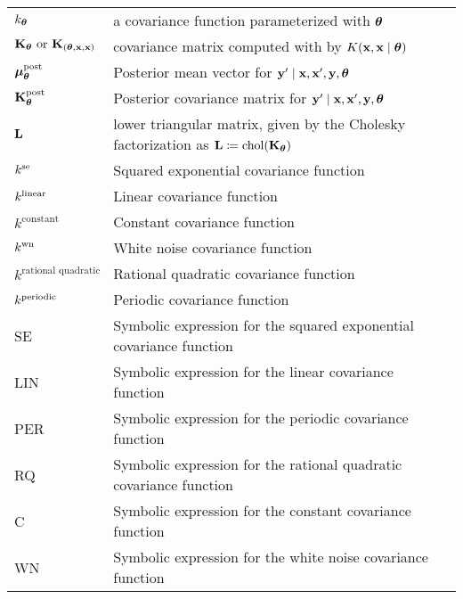 \begin{tabular}{l l}
$k_{\bm{\theta}}$			&  a covariance function parameterized with
$\bm{\theta}$\\

$\mathbf{K}_{\bm{\theta}}\text{ or }\mathbf{K}_{(\bm{\theta},\mathbf{x},\mathbf{x})}$		&  covariance matrix
computed with by $K(\mathbf{x},\mathbf{x} \mid \bm{\theta})$   \\
$\bm{\mu}_{\bm{\theta}}^\text{post}$ &  Posterior mean vector for $\mathbf{y}^\prime \mid \mathbf{x}, \mathbf{x}^\prime, \mathbf{y}, \bm{\theta}$ \\
$\mathbf{K}_{\bm{\theta}}^\text{post}$     &  Posterior covariance matrix for $\mathbf{y}^\prime \mid \mathbf{x}, \mathbf{x}^\prime, \mathbf{y}, \bm{\theta}$ \\
$\mathbf{L}$			&lower triangular matrix, given by the Cholesky factorization as 
$\mathbf{L}\coloneqq \text{chol}(\mathbf{K}_{\bm{\theta}})$\\

$k^\text{se}$ &  Squared exponential covariance function  \\
$k^\text{linear}$ &  Linear covariance function  \\
$k^{\text{constant}}$ &  Constant covariance function  \\
$k^\text{wn}$ &  White noise covariance function  \\
$k^{\text{rational quadratic}}$  &  Rational quadratic covariance function  \\
$k^\text{periodic}$ &  Periodic covariance function  \\

SE			&  Symbolic expression for the squared exponential covariance function  \\
LIN		        &  Symbolic expression for the linear covariance function  \\
PER		        &  Symbolic expression for the periodic covariance function  \\
RQ		        &  Symbolic expression for the rational quadratic covariance function  \\
C		        &  Symbolic expression for the constant covariance function  \\
WN		        &  Symbolic expression for the white noise covariance function  \\
\end{tabular}
\newpage
